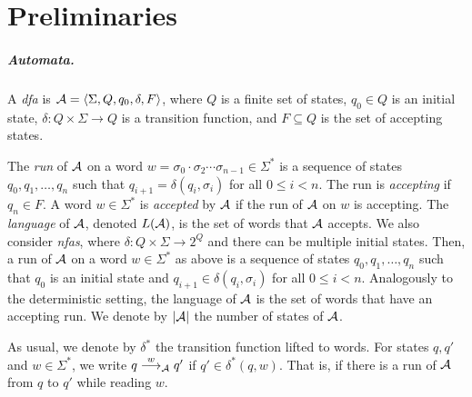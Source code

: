 \chapter{Preliminaries}
\label{chap:prelims}

\paragraph*{Automata.}
A \emph{\gls{dfa}} is $\mathcal{A}=\left< \Sigma,Q,q_0,\delta,F\right>$, where $Q$ is a finite set of states, $q_0 \in Q$ is an initial state, $\delta: Q\times \Sigma \to Q$ is a transition function, and $F\subseteq Q$ is the set of accepting states. 

The \emph{run} of $\mathcal{A}$ on a word $w=\sigma_0 \cdot \sigma_2 \cdots \sigma_{n-1}\in \Sigma^*$ is a sequence of states $q_0,q_1,\ldots,q_n$ such that $q_{i+1} = \delta(q_i,\sigma_{i})$ for all $0\le i<n$. 
The run is \emph{accepting} if $q_n\in F$. A word $w \in \Sigma^*$ is \emph{accepted} by $\mathcal{A}$ if the run of $\mathcal{A}$ on $w$ is accepting. The \emph{language} of $\mathcal{A}$, denoted $L(\mathcal{A})$, is the set of words that $\mathcal{A}$ accepts.
We also consider \emph{\glspl{nfa}}, where $\delta:Q\times \Sigma\to 2^Q$ and there can be multiple initial states. Then, a run of $\mathcal{A}$ on a word $w\in \Sigma^*$ as above is a sequence of states $q_0,q_1,\ldots,q_n$ such that $q_0$ is an initial state and $q_{i+1} \in \delta(q_i,\sigma_{i})$ for all $0\le i<n$. Analogously to the deterministic setting, the language of $\mathcal{A}$ is the set of words that have an accepting run.
We denote by $|\mathcal{A}|$ the number of states of $\mathcal{A}$.

As usual, we denote by $\delta^*$ the transition function lifted to words.
For states $q,q'$ and $w\in \Sigma^*$, we write $q\stackrel{w}{\longrightarrow}_{\mathcal{A}}q'$ if $q'\in \delta^*(q,w)$. That is, if there is a run of $\mathcal{A}$ from $q$ to $q'$ while reading $w$.


